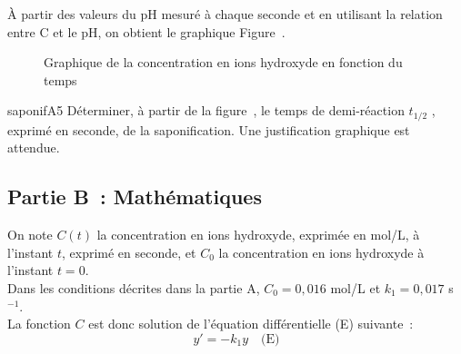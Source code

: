 À partir des valeurs du pH mesuré à chaque seconde et en utilisant la relation entre C et le
pH, on obtient le graphique Figure~.

\begin{figure}[h]
    \centering
    \caption{Graphique de la concentration en ions hydroxyde en fonction du temps}
\end{figure}

\vspace{0.5cm}
\begin{questionmult}{saponifA5}
     Déterminer, à partir de la figure~, le temps de demi-réaction $t_{1/2}$ , exprimé en seconde, de la saponification. Une justification graphique est attendue.\\
    \begin{EnvQuadrillage}[NbCarreaux=19x4,Grille=Seyes,Marge=1]
    \end{EnvQuadrillage}
\end{questionmult}

\subsection{Partie B~: Mathématiques}

On note $C(t)$ la concentration en ions hydroxyde, exprimée en mol/L, à l’instant $t$, exprimé en seconde, et $C_0$ la concentration en ions hydroxyde à l’instant $t = 0$.\\
Dans les conditions décrites dans la partie A, $C_0 = 0,016$ mol/L et $k_1 = 0,017$ s$^{-1}$.\\
La fonction $C$ est donc solution de l’équation différentielle (E) suivante~:
$$ y' = -k_1 y \quad \text{(E)} $$

